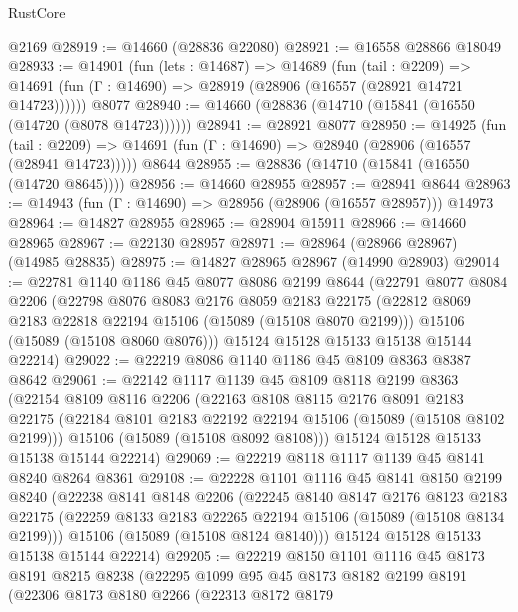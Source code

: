 \begin{lexlean}{RustCore}
\begin{coremodule}
    @2169
@28919 := @14660 (@28836 @22080)
@28921 := @16558 @28866 @18049
@28933 := @14901
    (fun (lets : @14687) =>
    @14689
      (fun (tail : @2209) =>
      @14691 (fun (Γ : @14690) => @28919 (@28906 (@16557 (@28921 @14721 @14723))))))
    @8077
@28940 := @14660 (@28836 (@14710 (@15841 (@16550 (@14720 (@8078 @14723))))))
@28941 := @28921 @8077
@28950 := @14925
    (fun (tail : @2209) => @14691 (fun (Γ : @14690) => @28940 (@28906 (@16557 (@28941 @14723)))))
    @8644
@28955 := @28836 (@14710 (@15841 (@16550 (@14720 @8645))))
@28956 := @14660 @28955
@28957 := @28941 @8644
@28963 := @14943 (fun (Γ : @14690) => @28956 (@28906 (@16557 @28957))) @14973
@28964 := @14827 @28955
@28965 := @28904 @15911
@28966 := @14660 @28965
@28967 := @22130 @28957
@28971 := @28964 (@28966 @28967) (@14985 @28835)
@28975 := @14827 @28965 @28967 (@14990 @28903)
@29014 := @22781
    @1140
    @1186
    @45
    @8077
    @8086
    @2199
    @8644
    (@22791
      @8077
      @8084
      @2206
      (@22798
        @8076
        @8083
        @2176
        @8059
        @2183
        @22175
        (@22812 @8069 @2183 @22818 @22194 @15106 (@15089 (@15108 @8070 @2199)))
        @15106
        (@15089 (@15108 @8060 @8076)))
      @15124
      @15128
      @15133
      @15138
      @15144
      @22214)
@29022 := @22219 @8086 @1140 @1186 @45 @8109 @8363 @8387 @8642
@29061 := @22142
    @1117
    @1139
    @45
    @8109
    @8118
    @2199
    @8363
    (@22154
      @8109
      @8116
      @2206
      (@22163
        @8108
        @8115
        @2176
        @8091
        @2183
        @22175
        (@22184 @8101 @2183 @22192 @22194 @15106 (@15089 (@15108 @8102 @2199)))
        @15106
        (@15089 (@15108 @8092 @8108)))
      @15124
      @15128
      @15133
      @15138
      @15144
      @22214)
@29069 := @22219 @8118 @1117 @1139 @45 @8141 @8240 @8264 @8361
@29108 := @22228
    @1101
    @1116
    @45
    @8141
    @8150
    @2199
    @8240
    (@22238
      @8141
      @8148
      @2206
      (@22245
        @8140
        @8147
        @2176
        @8123
        @2183
        @22175
        (@22259 @8133 @2183 @22265 @22194 @15106 (@15089 (@15108 @8134 @2199)))
        @15106
        (@15089 (@15108 @8124 @8140)))
      @15124
      @15128
      @15133
      @15138
      @15144
      @22214)
@29205 := @22219
    @8150
    @1101
    @1116
    @45
    @8173
    @8191
    @8215
    @8238
    (@22295
      @1099
      @95
      @45
      @8173
      @8182
      @2199
      @8191
      (@22306
        @8173
        @8180
        @2266
        (@22313
          @8172
          @8179

\end{coremodule}
\end{lexlean}
